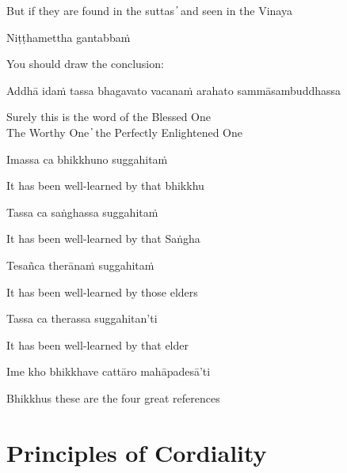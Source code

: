 \begin{cprenglish}
  But if they are found in the suttas  ̓  and seen in the Vinaya
\end{cprenglish}

Niṭṭhamettha gantabbaṁ

\begin{cprenglish}
  You should draw the conclusion:
\end{cprenglish}

Addhā idaṁ tassa bhagavato vacanaṁ arahato sammāsambuddhassa

\begin{cprenglish}
  Surely this is the word of the Blessed One\\
  The Worthy One  ̓  the Perfectly Enlightened One
\end{cprenglish}

Imassa ca bhikkhuno suggahitaṁ

\begin{cprenglish}
  It has been well-learned by that bhikkhu
\end{cprenglish}

Tassa ca saṅghassa suggahitaṁ

\begin{cprenglish}
  It has been well-learned by that Saṅgha
\end{cprenglish}

Tesañca therānaṁ suggahitaṁ

\begin{cprenglish}
  It has been well-learned by those elders
\end{cprenglish}

Tassa ca therassa suggahitan’ti

\begin{cprenglish}
  It has been well-learned by that elder
\end{cprenglish}

Ime kho bhikkhave cattāro mahāpadesā’ti

\begin{cprenglish}
  Bhikkhus these are the four great references
\end{cprenglish}

\suttaRef{[AN 4.180]}

\clearpage

\section{Principles of Cordiality}

